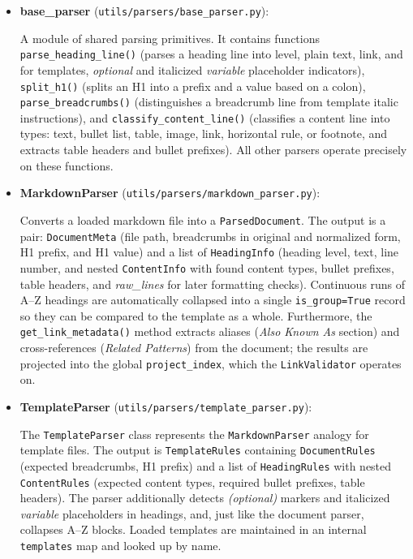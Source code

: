 \documentclass[12pt, a4paper]{article}
\begin{document}
\begin{itemize}
    \begin{itemize}
        \item \textbf{base\_parser} (\texttt{utils/parsers/base\_parser.py}):

        A module of shared parsing primitives. It contains functions \texttt{parse\_heading\_line()} 
        (parses a heading line into level, plain text, link, and for templates, \emph{optional} and italicized \emph{variable} 
        placeholder indicators), \texttt{split\_h1()} (splits an H1 into a prefix and a value based on a colon), 
        \texttt{parse\_breadcrumbs()} (distinguishes a breadcrumb line from template italic instructions), 
        and \texttt{classify\_content\_line()} (classifies a content line into types: text, bullet list, table, 
        image, link, horizontal rule, or footnote, and extracts table headers and bullet prefixes). 
        All other parsers operate precisely on these functions.

        \item \textbf{MarkdownParser} (\texttt{utils/parsers/markdown\_parser.py}):

        Converts a loaded markdown file into a \texttt{ParsedDocument}. The output is a pair: 
        \texttt{DocumentMeta} (file path, breadcrumbs in original and normalized form, H1 prefix, and H1 value) 
        and a list of \texttt{HeadingInfo} (heading level, text, line number, and nested \texttt{ContentInfo} 
        with found content types, bullet prefixes, table headers, and \emph{raw\_lines} for later formatting checks). 
        Continuous runs of A--Z headings are automatically collapsed into a single \texttt{is\_group=True} 
        record so they can be compared to the template as a whole. Furthermore, the \texttt{get\_link\_metadata()} 
        method extracts aliases (\emph{Also Known As} section) and cross-references (\emph{Related Patterns}) 
        from the document; the results are projected into the global \texttt{project\_index}, which the 
        \texttt{LinkValidator} operates on.

        \item \textbf{TemplateParser} (\texttt{utils/parsers/template\_parser.py}):

        The \texttt{TemplateParser} class represents the \texttt{MarkdownParser} analogy for template files. 
        The output is \texttt{TemplateRules} containing \texttt{DocumentRules} (expected breadcrumbs, H1 prefix) 
        and a list of \texttt{HeadingRules} with nested \texttt{ContentRules} (expected content types, 
        required bullet prefixes, table headers). The parser additionally detects \emph{(optional)} 
        markers and italicized \emph{variable} placeholders in headings, and, just like the document parser, 
        collapses A--Z blocks. Loaded templates are maintained in an internal \texttt{templates} map and looked up by name.
        

\end{itemize}
\end{itemize}
\end{document}
